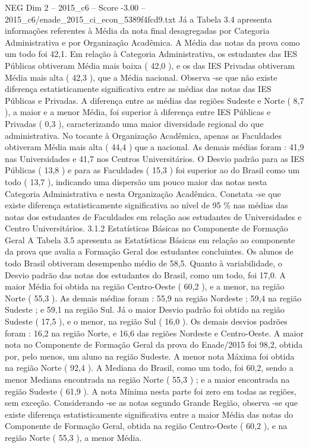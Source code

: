 \begin{textsample}{NEG Dim 2 – 2015\_c6 – Score -3.00 – 2015\_c6/enade\_2015\_ci\_econ\_5389f4fcd9.txt}
Já a Tabela 3.4 apresenta informações referentes à Média da nota final desagregadas por Categoria Administrativa e por Organização Acadêmica.
A Média das notas da prova como um todo foi 42,1.
Em relação à Categoria Administrativa, os estudantes das IES Públicas obtiveram Média mais baixa ( 42,0 ), e os das IES Privadas obtiveram Média mais alta ( 42,3 ), que a Média nacional.
Observa -se que não existe diferença estatisticamente significativa entre as médias das notas das IES Públicas e Privadas.
A diferença entre as médias das regiões Sudeste e Norte ( 8,7 ), a maior e a menor Média, foi superior à diferença entre IES Públicas e Privadas ( 0,3 ), caracterizando uma maior diversidade regional do que administrativa.
No tocante à Organização Acadêmica, apenas as Faculdades obtiveram Média mais alta ( 44,4 ) que a nacional.
As demais médias foram : 41,9 nas Universidades e 41,7 nos Centros Universitários.
O Desvio padrão para as IES Públicas ( 13,8 ) e para as Faculdades ( 15,3 ) foi superior ao do Brasil como um todo ( 13,7 ), indicando uma dispersão um pouco maior das notas nesta Categoria Administrativa e nesta Organização Acadêmica.
Constata -se que existe diferença estatisticamente significativa ao nível de 95 \% nas médias das notas dos estudantes de Faculdades em relação aos estudantes de Universidades e Centro Universitários. 3.1.2 Estatísticas Básicas no Componente de Formação Geral A Tabela 3.5 apresenta as Estatísticas Básicas em relação ao componente da prova que avalia a Formação Geral dos estudantes concluintes.
Os alunos de todo Brasil obtiveram desempenho médio de 58,5.
Quanto à variabilidade, o Desvio padrão das notas dos estudantes do Brasil, como um todo, foi 17,0.
A maior Média foi obtida na região Centro-Oeste ( 60,2 ), e a menor, na região Norte ( 55,3 ).
As demais médias foram : 55,9 na região Nordeste ; 59,4 na região Sudeste ; e 59,1 na região Sul.
Já o maior Desvio padrão foi obtido na região Sudeste ( 17,5 ), e o menor, na região Sul ( 16,0 ).
Os demais desvios padrões foram : 16,2 na região Norte, e 16,6 das regiões Nordeste e Centro-Oeste.
A maior nota no Componente de Formação Geral da prova do Enade/2015 foi 98,2, obtida por, pelo menos, um aluno na região Sudeste.
A menor nota Máxima foi obtida na região Norte ( 92,4 ).
A Mediana do Brasil, como um todo, foi 60,2, sendo a menor Mediana encontrada na região Norte ( 55,3 ) ; e a maior encontrada na região Sudeste ( 61,9 ).
A nota Mínima nesta parte foi zero em todas as regiões, sem exceção.
Considerando -se as notas segundo Grande Região, observa -se que existe diferença estatisticamente significativa entre a maior Média das notas do Componente de Formação Geral, obtida na região Centro-Oeste ( 60,2 ), e na região Norte ( 55,3 ), a menor Média.

\end{textsample}
